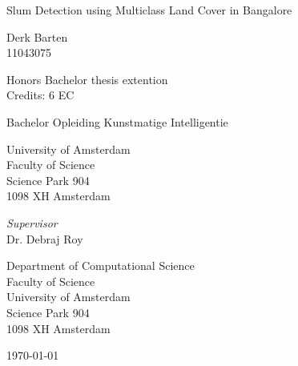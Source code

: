 \begin{center}

\vspace{1.7cm}

\begin{Huge}
Slum Detection using Multiclass Land Cover in Bangalore
\end{Huge}


\vspace{1.5cm}

Derk Barten\\
11043075

\vspace{1.5cm}

Honors Bachelor thesis extention\\
Credits: 6 EC

\vspace{0.5cm}

Bachelor Opleiding Kunstmatige Intelligentie

\vspace{0.25cm}

University of Amsterdam\\
Faculty of Science\\
Science Park 904\\
1098 XH Amsterdam

\vspace{4cm}

\emph{Supervisor}\\
Dr. Debraj Roy

\vspace{0.25cm}

Department of Computational Science\\
Faculty of Science\\
University of Amsterdam\\
Science Park 904\\
1098 XH  Amsterdam

\vspace{1.5cm}

\today

\end{center}

